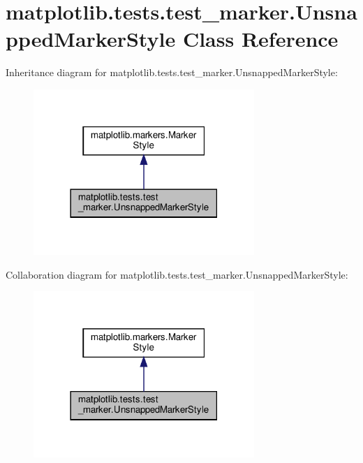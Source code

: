 \hypertarget{classmatplotlib_1_1tests_1_1test__marker_1_1UnsnappedMarkerStyle}{}\section{matplotlib.\+tests.\+test\+\_\+marker.\+Unsnapped\+Marker\+Style Class Reference}
\label{classmatplotlib_1_1tests_1_1test__marker_1_1UnsnappedMarkerStyle}


Inheritance diagram for matplotlib.\+tests.\+test\+\_\+marker.\+Unsnapped\+Marker\+Style\+:
\nopagebreak
\begin{figure}[H]
\begin{center}
\leavevmode
\includegraphics[width=237pt]{classmatplotlib_1_1tests_1_1test__marker_1_1UnsnappedMarkerStyle__inherit__graph}
\end{center}
\end{figure}


Collaboration diagram for matplotlib.\+tests.\+test\+\_\+marker.\+Unsnapped\+Marker\+Style\+:
\nopagebreak
\begin{figure}[H]
\begin{center}
\leavevmode
\includegraphics[width=237pt]{classmatplotlib_1_1tests_1_1test__marker_1_1UnsnappedMarkerStyle__coll__graph}
\end{center}
\end{figure}
